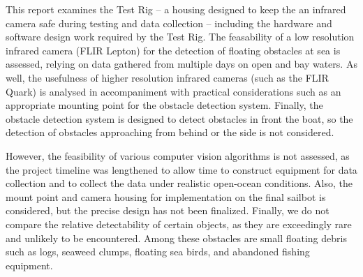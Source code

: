 
\iffalse
From the guideline:
This is where the subject of the report can be specified fully; indicate not only what you are examining, but also when and where, as appropriate. As well as knowing what to expect in your report, your reader needs to know what not to expect. Indicate the kinds of problems, places, times, and personnel that are not considered and the impact these omissions and constraints may have on your results. You may also want to explain why these limitations have been necessary.

Notes:
what does the report consider?
-test rig, design and development
-testing IR camera feasibility on two days
-developing a control system for the test rig, allowing for video capture
-the team might be able to get a better camera
-long cables seem to be fine

what didn't we do?
-we don't evaluate which algorithms are best
--we spent a lot of time getting ready to gather data (getting test rigs built and working)
--lots of time on video processing systems to get good contrast
-the lepton cannot see small objects such as logs
-we don't provide a final housing
--sailbot might use our lepton holder, but will need to design a smaller waterproof case for it

impact of omissions:
-we can suggest a lepton holder, but not a final housing
-our work will help the sailbot team test algorithms and gather data, but we can't comment on the best algorithms
\fi

This report examines the Test Rig -- a housing designed to keep the an infrared camera safe during testing and data collection -- including the hardware and software design work required by the Test Rig. The feasability of a low resolution infrared camera (FLIR Lepton) for the detection of floating obstacles at sea is assessed, relying on data gathered from multiple days on open and bay waters. As well, the usefulness of higher resolution infrared cameras (such as the FLIR Quark) is analysed in accompaniment with practical considerations such as an appropriate mounting point for the obstacle detection system. Finally, the obstacle detection system is designed to detect obstacles in front the boat, so the detection of obstacles approaching from behind or the side is not considered.

However, the feasibility of various computer vision algorithms is not assessed, as the project timeline was lengthened to allow time to construct equipment for data collection and to collect the data under realistic open-ocean conditions. Also, the mount point and camera housing for implementation on the final sailbot is considered, but the precise design has not been finalized. Finally, we do not compare the relative detectability of certain objects, as they are exceedingly rare and unlikely to be encountered. Among these obstacles are small floating debris such as logs, seaweed clumps, floating sea birds, and abandoned fishing equipment.
